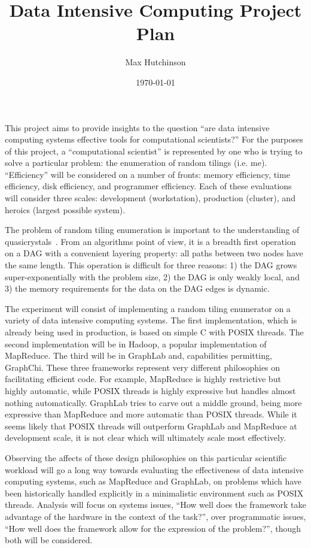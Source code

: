 \documentclass{article}
\begin{document}
\title{Data Intensive Computing Project Plan}
\author{Max Hutchinson}
\date{\today}
\maketitle

This project aims to provide insights to the question ``are data intensive computing systems effective tools for computational scientists?''  For the purposes of this project, a ``computational scientist'' is represented by one who is trying to solve a particular problem: the enumeration of random tilings (i.e. me).  ``Efficiency'' will be considered on a number of fronts: memory efficiency, time efficiency, disk efficiency, and programmer efficiency.  Each of these evaluations will consider three scales: development (workstation), production (cluster), and heroics (largest possible system).

The problem of random tiling enumeration is important to the understanding of quasicrystals~\cite{Shechtman1984,Levine1984}.  From an algorithms point of view, it is a breadth first operation~\cite{Dest01} on a DAG with a convenient layering property: all paths between two nodes have the same length.  This operation is difficult for three reasons: 1) the DAG grows super-exponentially with the problem size, 2) the DAG is only weakly local, and 3) the memory requirements for the data on the DAG edges is dynamic.

The experiment will consist of implementing a random tiling enumerator on a variety of data intensive computing systems.  The first implementation, which is already being used in production, is based on simple C with POSIX threads.  The second implementation will be in Hadoop, a popular implementation of MapReduce.  The third will be in GraphLab and, capabilities permitting, GraphChi.  These three frameworks represent very different philosophies on facilitating efficient code.  For example, MapReduce is highly restrictive but highly automatic, while POSIX threads is highly expressive but handles almost nothing automatically.  GraphLab tries to carve out a middle ground, being more expressive than MapReduce and more automatic than POSIX threads.  While it seems likely that POSIX threads will outperform GraphLab and MapReduce at development scale, it is not clear which will ultimately scale most effectively.

Observing the affects of these design philosophies on this particular scientific workload will go a long way towards evaluating the effectiveness of data intensive computing systems, such as MapReduce and GraphLab, on problems which have been historically handled explicitly in a minimalistic environment such as POSIX threads.  Analysis will focus on systems issues, ``How well does the framework take advantage of the hardware in the context of the task?'', over programmatic issues, ``How well does the framework allow for the expression of the problem?'', though both will be considered.  



\end{document}
